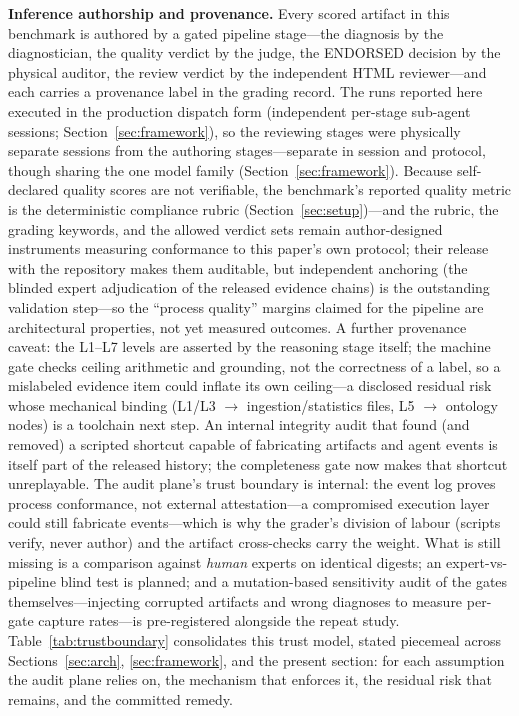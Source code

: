 \documentclass[preprint,10pt]{elsarticle}
\begin{document}
\textbf{Inference authorship and provenance.} Every scored artifact in this benchmark is authored by a gated pipeline stage---the diagnosis by the diagnostician, the quality verdict by the judge, the ENDORSED decision by the physical auditor, the review verdict by the independent HTML reviewer---and each carries a provenance label in the grading record. The runs reported here executed in the production dispatch form (independent per-stage sub-agent sessions; Section~\ref{sec:framework}), so the reviewing stages were physically separate sessions from the authoring stages---separate in session and protocol, though sharing the one model family (Section~\ref{sec:framework}). Because self-declared quality scores are not verifiable, the benchmark's reported quality metric is the deterministic compliance rubric (Section~\ref{sec:setup})---and the rubric, the grading keywords, and the allowed verdict sets remain author-designed instruments measuring conformance to this paper's own protocol; their release with the repository makes them auditable, but independent anchoring (the blinded expert adjudication of the released evidence chains) is the outstanding validation step---so the ``process quality'' margins claimed for the pipeline are architectural properties, not yet measured outcomes. A further provenance caveat: the L1--L7 levels are asserted by the reasoning stage itself; the machine gate checks ceiling arithmetic and grounding, not the correctness of a label, so a mislabeled evidence item could inflate its own ceiling---a disclosed residual risk whose mechanical binding (L1/L3 $\to$ ingestion/statistics files, L5 $\to$ ontology nodes) is a toolchain next step. An internal integrity audit that found (and removed) a scripted shortcut capable of fabricating artifacts and agent events is itself part of the released history; the completeness gate now makes that shortcut unreplayable. The audit plane's trust boundary is internal: the event log proves process conformance, not external attestation---a compromised execution layer could still fabricate events---which is why the grader's division of labour (scripts verify, never author) and the artifact cross-checks carry the weight. What is still missing is a comparison against \emph{human} experts on identical digests; an expert-vs-pipeline blind test is planned; and a mutation-based sensitivity audit of the gates themselves---injecting corrupted artifacts and wrong diagnoses to measure per-gate capture rates---is pre-registered alongside the repeat study. Table~\ref{tab:trustboundary} consolidates this trust model, stated piecemeal across Sections~\ref{sec:arch}, \ref{sec:framework}, and the present section: for each assumption the audit plane relies on, the mechanism that enforces it, the residual risk that remains, and the committed remedy.
\end{document}

